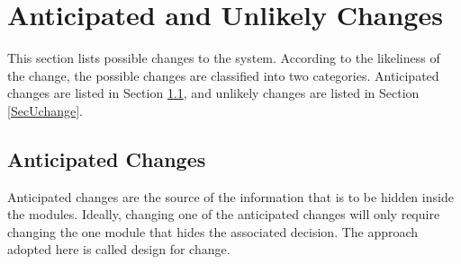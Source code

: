 \documentclass[12pt, titlepage]{article}
\begin{document}
\section{Anticipated and Unlikely Changes} \label{SecChange}

This section lists possible changes to the system. According to the likeliness
of the change, the possible changes are classified into two
categories. Anticipated changes are listed in Section \ref{SecAchange}, and
unlikely changes are listed in Section \ref{SecUchange}.

\subsection{Anticipated Changes} \label{SecAchange}

Anticipated changes are the source of the information that is to be hidden
inside the modules. Ideally, changing one of the anticipated changes will only
require changing the one module that hides the associated decision. The approach
adopted here is called design for change.
\end{document}

